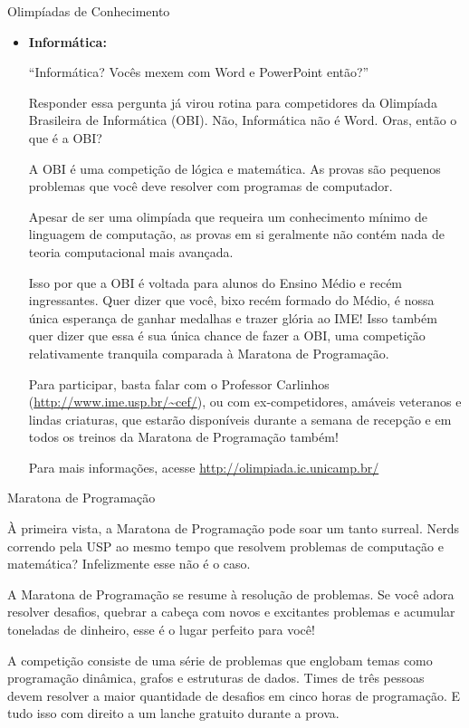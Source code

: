 \begin{subsecao}{Olimpíadas de Conhecimento}
\begin{itemize}
\item{\bf Informática: }

``Informática? Vocês mexem com Word e PowerPoint então?''

Responder essa pergunta já virou rotina para competidores da
Olimpíada Brasileira de Informática (OBI). Não, Informática 
não é Word. Oras, então o que é a OBI?

A OBI é uma competição de lógica e matemática. As provas são pequenos
problemas que você deve resolver com programas de computador.

Apesar de ser uma olimpíada que requeira um conhecimento mínimo de 
linguagem de computação, as provas em si geralmente não contém nada 
de teoria computacional mais avançada. 

Isso por que a OBI é voltada para alunos do Ensino Médio e recém
ingressantes. Quer dizer que você, bixo recém formado do Médio,
é nossa única esperança de ganhar medalhas e trazer glória ao IME!
Isso também quer dizer que essa é sua única chance de fazer a OBI,
uma competição relativamente tranquila comparada à Maratona de 
Programação.

Para participar, basta falar com o Professor Carlinhos (\url{http://www.ime.usp.br/~cef/}), 
ou com ex-competidores, amáveis veteranos e lindas criaturas, que estarão disponíveis
durante a semana de recepção e em todos os treinos da Maratona de Programação também!

Para mais informações, acesse \url{http://olimpiada.ic.unicamp.br/}

\end{itemize}

\begin{subsubsecao}{Maratona de Programação}

À primeira vista, a Maratona de Programação pode soar um tanto
surreal. Nerds correndo pela USP ao mesmo tempo que resolvem
problemas de computação e matemática? Infelizmente esse não
é o caso.

A Maratona de Programação se resume à resolução de problemas.
Se você adora resolver desafios, quebrar a cabeça com novos
e excitantes problemas e acumular toneladas de dinheiro, esse
é o lugar perfeito para você!

A competição consiste de uma série de problemas que englobam
temas como programação dinâmica, grafos e estruturas de dados.
Times de três pessoas devem resolver a maior quantidade de
desafios em cinco horas de programação. E tudo isso com direito
a um lanche gratuito durante a prova.


\end{subsubsecao}
\end{subsecao}
